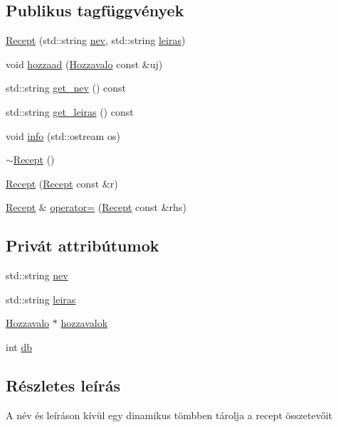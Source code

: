 \subsection*{Publikus tagfüggvények}
\begin{DoxyCompactItemize}
\item 
\hyperlink{classRecept_a9cdc66661e60cfe82d1c85e3640b505f}{Recept} (std\+::string \hyperlink{classRecept_afdc9105fc79f5027da1aebb6fd908b78}{nev}, std\+::string \hyperlink{classRecept_ab45575aab9abd31171cd35eb74665389}{leiras})
\item 
void \hyperlink{classRecept_a24ab7eb66a011f79e99bb2325148382e}{hozzaad} (\hyperlink{classHozzavalo}{Hozzavalo} const \&uj)
\item 
std\+::string \hyperlink{classRecept_a9936225342590bd721f477432fb162f4}{get\+\_\+nev} () const 
\item 
std\+::string \hyperlink{classRecept_a22e27d4afe257de56df8a84a5377f2af}{get\+\_\+leiras} () const 
\item 
void \hyperlink{classRecept_a2eccb11470a34650f8faad733960f66e}{info} (std\+::ostream os)
\item 
\hyperlink{classRecept_a53d1a6a6ae6983cd6e409051156535a4}{$\sim$\+Recept} ()
\item 
\hyperlink{classRecept_af73dd83922a0f5d9016d450bf1bd5d2c}{Recept} (\hyperlink{classRecept}{Recept} const \&r)
\item 
\hyperlink{classRecept}{Recept} \& \hyperlink{classRecept_adb6db4fde2bc6700b63a8750012be6b8}{operator=} (\hyperlink{classRecept}{Recept} const \&rhs)
\end{DoxyCompactItemize}
\subsection*{Privát attribútumok}
\begin{DoxyCompactItemize}
\item 
std\+::string \hyperlink{classRecept_afdc9105fc79f5027da1aebb6fd908b78}{nev}
\item 
std\+::string \hyperlink{classRecept_ab45575aab9abd31171cd35eb74665389}{leiras}
\item 
\hyperlink{classHozzavalo}{Hozzavalo} $\ast$ \hyperlink{classRecept_afb5204c5461622e25fd7c89da9874c01}{hozzavalok}
\item 
int \hyperlink{classRecept_a23e1d3a87bfdbd571a7641bd0b933eb8}{db}
\end{DoxyCompactItemize}


\subsection{Részletes leírás}
A név és leíráson kívül egy dinamikus tömbben tárolja a recept összetevőit 

